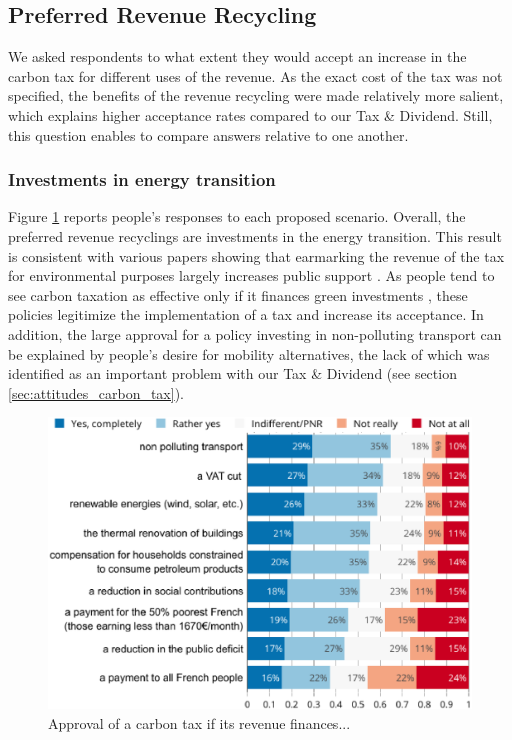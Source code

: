 \documentclass[english,5p,authoryear]{elsarticle}
\begin{document}
    \subsection{Preferred Revenue Recycling}
%

%
We asked respondents to what extent they would accept an increase in the carbon tax for different uses of the revenue. As the exact cost of the tax was not specified, the benefits of the revenue recycling were made relatively more salient, which explains higher acceptance rates compared to our Tax \& Dividend. Still, this question enables to compare answers relative to one another.

        \subsubsection{Investments in energy transition}

%
%
%
Figure \ref{fig:recycling} reports people's responses to each proposed scenario. Overall, the preferred revenue recyclings are investments in the energy transition. This result is consistent with various papers showing that earmarking the revenue of the tax for environmental purposes largely increases public support \citep[for a review of the literature, see for instance][]{kallbekken_aasen_2010,carattini_overcoming_2018}. As people tend to see carbon taxation as effective only if it finances green investments \citep{saelen_kallbekken_2011}, these policies legitimize the implementation of a tax and increase its acceptance. In addition, the large approval for a policy investing in non-polluting transport can be explained by people's desire for mobility alternatives, the lack of which was identified as an important problem with our Tax \& Dividend (see section \ref{sec:attitudes_carbon_tax}). %

%

%

\begin{figure}[!htbp]
\centering
\includegraphics[width=\columnwidth]{Images_EPS/tax_condition_valc.eps}
\caption{Approval of a carbon tax if its revenue finances...}
\label{fig:recycling}
\end{figure}
\end{document}
